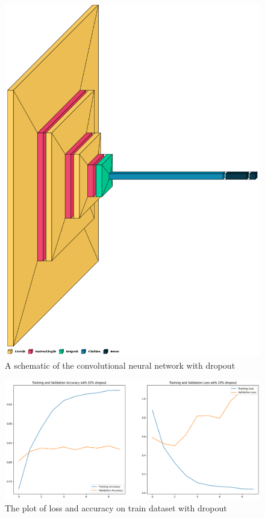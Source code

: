 \documentclass[11pt,a4paper]{article}
\begin{document}
 \begin{figure}[h!]
 \centering
  \includegraphics[width=0.85\linewidth]{dropout_schema.png}
  \caption{A schematic of the convolutional neural network with dropout}
  \label{dropout_schema}
\end{figure}


 \begin{figure}[h!]
 \centering
  \includegraphics[width=\linewidth]{dropout_training_plot.png}
  \caption{The plot of loss and accuracy on train dataset with dropout}
  \label{dropout_training}
\end{figure}
\FloatBarrier
\end{document}
